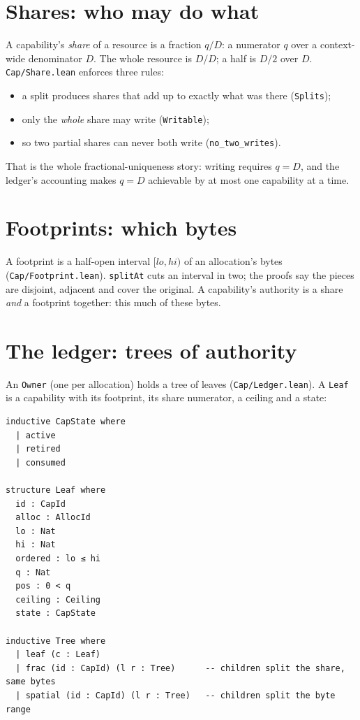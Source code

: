 \documentclass[10pt,a4paper]{article}
\newcommand{\file}[1]{\texttt{#1}}
\newcommand{\lean}[1]{\texttt{#1}}
\begin{document}
\section{Shares: who may do what}

A capability's \emph{share} of a resource is a fraction $q/D$: a numerator $q$
over a context-wide denominator $D$. The whole resource is $D/D$; a half is
$D/2$ over $D$. \file{Cap/Share.lean} enforces three rules:

\begin{itemize}[leftmargin=1.4em]
\item a split produces shares that add up to exactly what was there
  (\lean{Splits});
\item only the \emph{whole} share may write (\lean{Writable});
\item so two partial shares can never both write (\lean{no\_two\_writes}).
\end{itemize}

That is the whole fractional-uniqueness story: writing requires $q = D$, and the
ledger's accounting makes $q = D$ achievable by at most one capability at a
time.

\section{Footprints: which bytes}

A footprint is a half-open interval $[lo, hi)$ of an allocation's bytes
(\file{Cap/Footprint.lean}). \lean{splitAt} cuts an interval in two; the proofs
say the pieces are disjoint, adjacent and cover the original. A capability's
authority is a share \emph{and} a footprint together: this much of these bytes.

\section{The ledger: trees of authority}

An \lean{Owner} (one per allocation) holds a tree of leaves
(\file{Cap/Ledger.lean}). A \lean{Leaf} is a capability with its footprint, its
share numerator, a ceiling and a state:

\begin{lstlisting}
inductive CapState where
  | active
  | retired
  | consumed

structure Leaf where
  id : CapId
  alloc : AllocId
  lo : Nat
  hi : Nat
  ordered : lo ≤ hi
  q : Nat
  pos : 0 < q
  ceiling : Ceiling
  state : CapState

inductive Tree where
  | leaf (c : Leaf)
  | frac (id : CapId) (l r : Tree)      -- children split the share, same bytes
  | spatial (id : CapId) (l r : Tree)   -- children split the byte range
\end{lstlisting}
\end{document}
